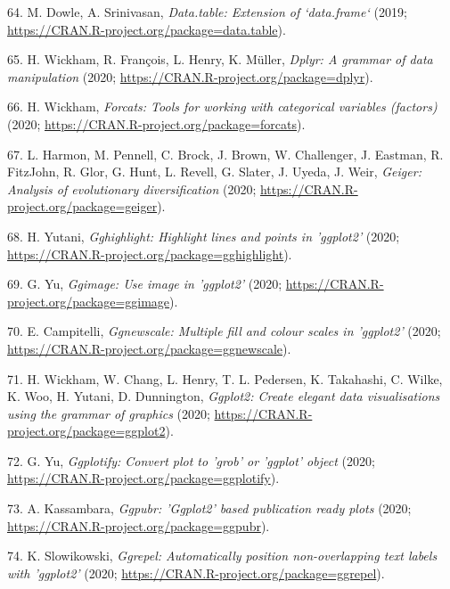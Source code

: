 \documentclass[]{elsarticle} %
\begin{document}
\leavevmode\hypertarget{ref-R-data.table}{}%
64. M. Dowle, A. Srinivasan, \emph{Data.table: Extension of `data.frame`} (2019; \url{https://CRAN.R-project.org/package=data.table}).

\leavevmode\hypertarget{ref-R-dplyr}{}%
65. H. Wickham, R. François, L. Henry, K. Müller, \emph{Dplyr: A grammar of data manipulation} (2020; \url{https://CRAN.R-project.org/package=dplyr}).

\leavevmode\hypertarget{ref-R-forcats}{}%
66. H. Wickham, \emph{Forcats: Tools for working with categorical variables (factors)} (2020; \url{https://CRAN.R-project.org/package=forcats}).

\leavevmode\hypertarget{ref-R-geiger}{}%
67. L. Harmon, M. Pennell, C. Brock, J. Brown, W. Challenger, J. Eastman, R. FitzJohn, R. Glor, G. Hunt, L. Revell, G. Slater, J. Uyeda, J. Weir, \emph{Geiger: Analysis of evolutionary diversification} (2020; \url{https://CRAN.R-project.org/package=geiger}).

\leavevmode\hypertarget{ref-R-gghighlight}{}%
68. H. Yutani, \emph{Gghighlight: Highlight lines and points in 'ggplot2'} (2020; \url{https://CRAN.R-project.org/package=gghighlight}).

\leavevmode\hypertarget{ref-R-ggimage}{}%
69. G. Yu, \emph{Ggimage: Use image in 'ggplot2'} (2020; \url{https://CRAN.R-project.org/package=ggimage}).

\leavevmode\hypertarget{ref-R-ggnewscale}{}%
70. E. Campitelli, \emph{Ggnewscale: Multiple fill and colour scales in 'ggplot2'} (2020; \url{https://CRAN.R-project.org/package=ggnewscale}).

\leavevmode\hypertarget{ref-R-ggplot2}{}%
71. H. Wickham, W. Chang, L. Henry, T. L. Pedersen, K. Takahashi, C. Wilke, K. Woo, H. Yutani, D. Dunnington, \emph{Ggplot2: Create elegant data visualisations using the grammar of graphics} (2020; \url{https://CRAN.R-project.org/package=ggplot2}).

\leavevmode\hypertarget{ref-R-ggplotify}{}%
72. G. Yu, \emph{Ggplotify: Convert plot to 'grob' or 'ggplot' object} (2020; \url{https://CRAN.R-project.org/package=ggplotify}).

\leavevmode\hypertarget{ref-R-ggpubr}{}%
73. A. Kassambara, \emph{Ggpubr: 'Ggplot2' based publication ready plots} (2020; \url{https://CRAN.R-project.org/package=ggpubr}).

\leavevmode\hypertarget{ref-R-ggrepel}{}%
74. K. Slowikowski, \emph{Ggrepel: Automatically position non-overlapping text labels with 'ggplot2'} (2020; \url{https://CRAN.R-project.org/package=ggrepel}).
\end{document}

